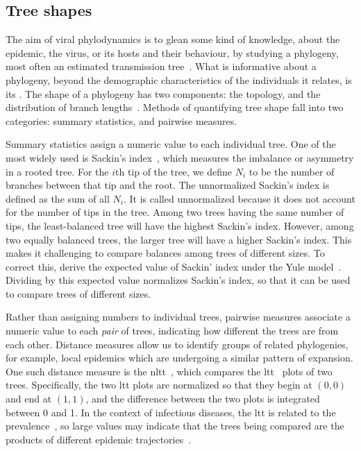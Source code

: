 \subsection{Tree shapes}
\label{subsubsec:treeshape}

The aim of viral phylodynamics is to glean some kind of knowledge, about the
epidemic, the virus, or its hosts and their behaviour, by studying a phylogeny,
most often an estimated transmission tree~\autocite{pybus2009evolutionary,
volz2013viral}. What is informative about a phylogeny, beyond the demographic
characteristics of the individuals it relates, is its . The shape
of a phylogeny has two components: the topology, and the distribution of branch
lengths~\autocite{mooers1997inferring}. Methods of quantifying tree shape fall
into two categories: summary statistics, and pairwise measures.

Summary statistics assign a numeric value to each individual tree. One of the
most widely used is Sackin's index~\autocite{shao1990tree}, which measures the
imbalance or asymmetry in a rooted tree. For the $i$th tip of the tree, we
define $N_i$ to be the number of branches between that tip and the root. The
unnormalized Sackin's index is defined as the sum of all $N_i$. It is called
unnormalized because it does not account for the number of tips in the tree.
Among two trees having the same number of tips, the least-balanced tree will
have the highest Sackin's index. However, among two equally balanced trees, the
larger tree will have a higher Sackin's index. This makes it challenging to
compare balances among trees of different sizes. To correct this,
\textcite{kirkpatrick1993searching} derive the expected value of Sackin' index
under the Yule model~\autocite{yule1925mathematical}. Dividing by this expected
value normalizes Sackin's index, so that it can be used to compare trees of
different sizes.

Rather than assigning numbers to individual trees, pairwise measures associate
a numeric value to each \textit{pair} of trees, indicating how different the
trees are from each other. Distance measures allow us to identify groups of
related phylogenies, for example, local epidemics which are undergoing a
similar pattern of expansion. One such distance measure is the
\gls{nltt}~\autocite{janzen2015approximate}, which compares the
\gls{ltt}~\autocite{nee1992tempo} plots of two trees. Specifically, the two
\gls{ltt} plots are normalized so that they begin at $(0, 0)$ and end at $(1,
1)$, and the difference between the two plots is integrated between 0 and 1. In
the context of infectious diseases, the \gls{ltt} is related to the
prevalence~\autocite{holmes1995revealing}, so large values may indicate that
the trees being compared are the products of different epidemic
trajectories~\autocite{janzen2015approximate}.

